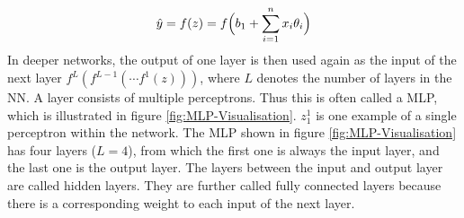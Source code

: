 \begin{equation}
    \centering
    \hat{y} = f(z) = f\Big(b_1 + \sum_{i=1}^n x_i \theta_i \Big)
    \label{eq:Perceptron-Calculate-Output}
\end{equation}
In deeper networks, the output of one layer is then used again as the input of the next layer $f^L(f^{L-1}(\cdots f^1(z)))$, where $L$ denotes the number of layers in the \gls{NN}. A layer consists of multiple perceptrons. Thus this is often called a \gls{MLP}, which is illustrated in figure \ref{fig:MLP-Visualisation}. $z_1^1$ is one example of a single perceptron within the network. The \gls{MLP} shown in figure \ref{fig:MLP-Visualisation} has four layers ($L = 4$), from which the first one is always the input layer, and the last one is the output layer. The layers between the input and output layer are called hidden layers. They are further called fully connected layers because there is a corresponding weight to each input of the next layer.

